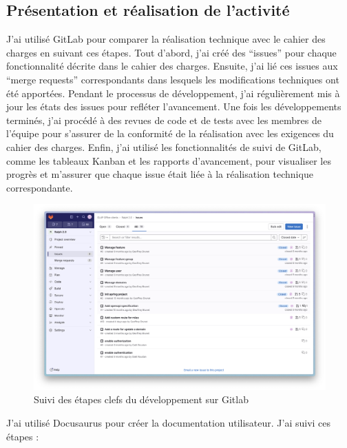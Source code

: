 \documentclass[a4paper, 11pt]{report}
\begin{document}
\subsection{Présentation et réalisation de l'activité}
  J'ai utilisé GitLab pour comparer la réalisation technique avec le
cahier des charges en suivant ces étapes. Tout d'abord, j'ai créé des
``issues'' pour chaque fonctionnalité décrite dans le cahier des
charges. Ensuite, j'ai lié ces issues aux ``merge requests''
correspondants dans lesquels les modifications techniques ont été
apportées. Pendant le processus de développement, j'ai régulièrement mis
à jour les états des issues pour refléter l'avancement. Une fois les
développements terminés, j'ai procédé à des revues de code et de tests
avec les membres de l'équipe pour s'assurer de la conformité de la
réalisation avec les exigences du cahier des charges. Enfin, j'ai
utilisé les fonctionnalités de suivi de GitLab, comme les tableaux
Kanban et les rapports d'avancement, pour visualiser les progrès et
m'assurer que chaque issue était liée à la réalisation technique
correspondante.
  \begin{figure}[H]
      \centering
      \includegraphics[scale=0.35,center]{screenshots/issues-gitlab.png}
      \caption{Suivi des étapes clefs du développement sur Gitlab}
  \end{figure}
  J'ai utilisé Docusaurus pour créer la documentation utilisateur. J'ai
suivi ces étapes :
\end{document}
